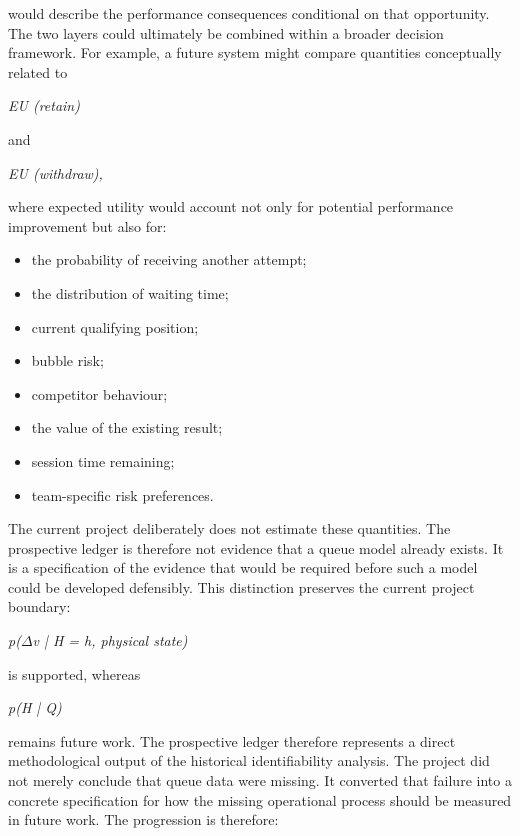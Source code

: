would describe the performance consequences conditional on that opportunity. The two layers could ultimately be combined within a broader decision framework. For example, a future system might compare quantities conceptually related to

\begin{center}\textit{EU (retain)}\end{center}

and

\begin{center}\textit{EU (withdraw),}\end{center}

where expected utility would account not only for potential performance improvement but also for:

\begin{itemize}
\item the probability of receiving another attempt;
\item the distribution of waiting time;
\item current qualifying position;
\item bubble risk;
\item competitor behaviour;
\item the value of the existing result;
\item session time remaining;
\item team-specific risk preferences.
\end{itemize}

The current project deliberately does not estimate these quantities. The prospective ledger is therefore not evidence that a queue model already exists. It is a specification of the evidence that would be required before such a model could be developed defensibly. This distinction preserves the current project boundary:

\begin{center}\textit{p(\ensuremath{\Delta}v | H = h, physical state)}\end{center}

is supported, whereas

\begin{center}\textit{p(H | Q)}\end{center}

remains future work. The prospective ledger therefore represents a direct methodological output of the historical identifiability analysis. The project did not merely conclude that queue data were missing. It converted that failure into a concrete specification for how the missing operational process should be measured in future work. The progression is therefore:

